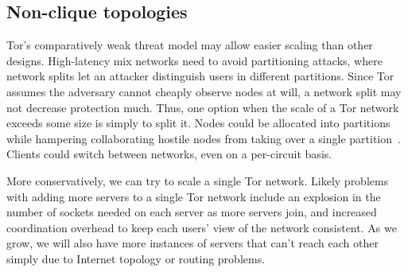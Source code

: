 \documentclass{llncs}
\begin{document}
\subsection{Non-clique topologies}

Tor's comparatively weak threat model may allow easier scaling than
other
designs.  High-latency mix networks need to avoid partitioning attacks, where
network splits let an attacker distinguish users in different partitions.
Since Tor assumes the adversary cannot cheaply observe nodes at will,
a network split may not decrease protection much.
Thus, one option when the scale of a Tor network
exceeds some size is simply to split it. Nodes could be allocated into
partitions while hampering collaborating hostile nodes from taking over
a single partition~\cite{casc-rep}.
Clients could switch between
networks, even on a per-circuit basis.

More conservatively, we can try to scale a single Tor network. Likely
problems with adding more servers to a single Tor network include an
explosion in the number of sockets needed on each server as more servers
join, and increased coordination overhead to keep each users' view of
the network consistent. As we grow, we will also have more instances of
servers that can't reach each other simply due to Internet topology or
routing problems.

\end{document}
